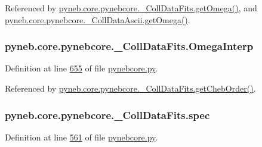 Referenced by \hyperlink{pynebcore_8py_source_l00811}{pyneb.\+core.\+pynebcore.\+\_\+\+Coll\+Data\+Fits.\+get\+Omega()}, and \hyperlink{pynebcore_8py_source_l01063}{pyneb.\+core.\+pynebcore.\+\_\+\+Coll\+Data\+Ascii.\+get\+Omega()}.

\hypertarget{classpyneb_1_1core_1_1pynebcore_1_1___coll_data_fits_a3e15df449393d23d1ac760671b5828cc}{}
\subsubsection[{Omega\+Interp}]{\setlength{\rightskip}{0pt plus 5cm}pyneb.\+core.\+pynebcore.\+\_\+\+Coll\+Data\+Fits.\+Omega\+Interp}\label{classpyneb_1_1core_1_1pynebcore_1_1___coll_data_fits_a3e15df449393d23d1ac760671b5828cc}


Definition at line \hyperlink{pynebcore_8py_source_l00655}{655} of file \hyperlink{pynebcore_8py_source}{pynebcore.\+py}.



Referenced by \hyperlink{pynebcore_8py_source_l00694}{pyneb.\+core.\+pynebcore.\+\_\+\+Coll\+Data\+Fits.\+get\+Cheb\+Order()}.

\hypertarget{classpyneb_1_1core_1_1pynebcore_1_1___coll_data_fits_a781126fa0e5b9bb0a4f6ae5afe4fd9a9}{}
\subsubsection[{spec}]{\setlength{\rightskip}{0pt plus 5cm}pyneb.\+core.\+pynebcore.\+\_\+\+Coll\+Data\+Fits.\+spec}\label{classpyneb_1_1core_1_1pynebcore_1_1___coll_data_fits_a781126fa0e5b9bb0a4f6ae5afe4fd9a9}


Definition at line \hyperlink{pynebcore_8py_source_l00561}{561} of file \hyperlink{pynebcore_8py_source}{pynebcore.\+py}.



